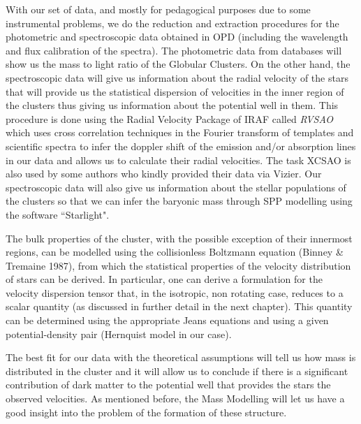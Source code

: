 With our set of data, and mostly for pedagogical purposes due to some instrumental problems, we do the reduction and extraction procedures for the photometric and spectroscopic data obtained in OPD (including the wavelength and flux calibration of the spectra). The photometric data from databases will show us the mass to light ratio of the Globular Clusters. On the other hand, the spectroscopic data will give us information about the radial velocity of the stars that will provide us the statistical dispersion of velocities in the inner region of the clusters thus giving us information about the potential well in them.  This procedure is done using the Radial Velocity Package of IRAF called \textit{RVSAO} which uses cross correlation techniques in the Fourier transform of templates and scientific spectra to infer the doppler shift of the emission and/or absorption lines in our data and allows us to calculate their radial velocities. The task XCSAO is also used by some authors who kindly provided their data via Vizier. Our spectroscopic data will also give us information about the stellar populations of the clusters so that we can infer the baryonic mass through SPP modelling using the software ``Starlight". 

The bulk properties of the cluster, with the possible exception of their innermost regions, can be modelled using the collisionless Boltzmann equation (Binney \& Tremaine 1987), from which the statistical properties of the velocity distribution of stars can be derived. In particular, one can derive a formulation for the velocity dispersion tensor that, in the isotropic, non rotating case, reduces to a scalar quantity (as discussed in further detail in the next chapter). This quantity can be determined using the appropriate Jeans equations and using a given potential-density pair (Hernquist model in our case).

The best fit for our data with the theoretical assumptions will tell us how mass is distributed in the cluster and it will allow us to conclude if there is a significant contribution of dark matter to the potential well that provides the stars the observed velocities. As mentioned before, the Mass Modelling will let us have a good insight into the problem of the formation of these structure.

\begin{center}
$\:$
\end{center}

\begin{center}
$\:$
\end{center}

\begin{center}
$\:$
\end{center}

\newpage
